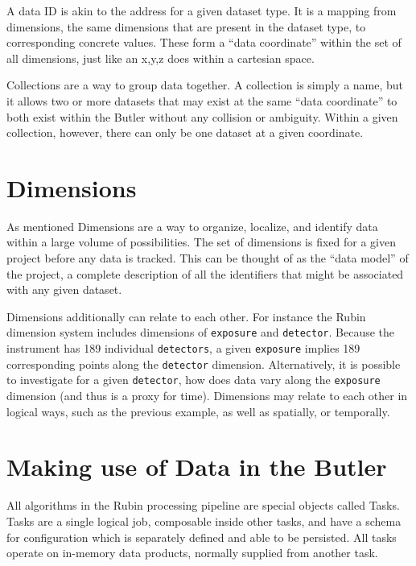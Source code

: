 \documentclass[11pt,twoside]{article}
\begin{document}
A data ID is akin to the address for a given dataset type. It is a mapping from dimensions, the same dimensions that are present in the dataset type, to corresponding concrete values. These form a ``data coordinate'' within the set of all dimensions, just like an x,y,z does within a cartesian space.

Collections are a way to group data together. A collection is simply a name, but it allows two or more datasets that may exist at the same ``data coordinate'' to both exist within the Butler without any collision or ambiguity. Within a given collection, however, there can only be one dataset at a given coordinate.

\section{Dimensions}
As mentioned Dimensions are a way to organize, localize, and identify data within a large volume of possibilities. The set of dimensions is fixed for a given project before any data is tracked. This can be thought of as the ``data model'' of the project, a complete description of all the identifiers that might be associated with any given dataset.

Dimensions additionally can relate to each other. For instance the Rubin dimension system includes dimensions of \texttt{exposure} and \texttt{detector}. Because the instrument has 189 individual \texttt{detectors}, a given \texttt{exposure} implies 189 corresponding points along the \texttt{detector} dimension. Alternatively, it is possible to investigate for a given \texttt{detector}, how does data vary along the \texttt{exposure} dimension (and thus is a proxy for time). Dimensions may relate to each other in logical ways, such as the previous example, as well as spatially, or temporally.

\section{Making use of Data in the Butler}
All algorithms in the Rubin processing pipeline are special objects called Tasks. Tasks are a single logical job, composable inside other tasks, and have a schema for configuration which is separately defined and able to be persisted. All tasks operate on in-memory data products, normally supplied from another task.
\end{document}
